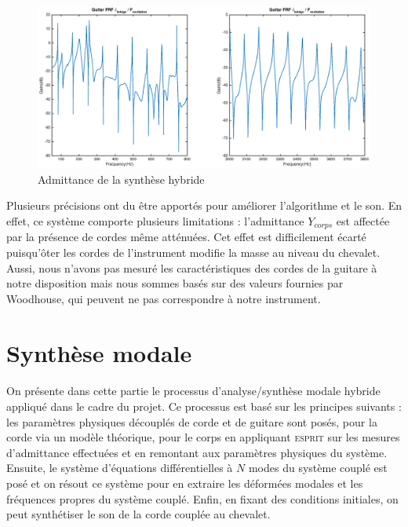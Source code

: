 \begin{figure}[h]
\centering
\includegraphics[width=\linewidth]{figures/FRF_E2.eps}
\caption{Admittance de la synthèse hybride}
\label{fig:frf_fig_1}
\end{figure}

Plusieurs précisions ont du être apportés pour améliorer l'algorithme et le
son. En effet, ce système comporte plusieurs limitations : l'admittance
$Y_{corps}$ est affectée par la présence de cordes même atténuées. Cet effet est difficilement écarté puisqu'ôter les cordes de l'instrument modifie la masse au niveau du chevalet. Aussi, nous n'avons pas mesuré les caractéristiques des cordes de la guitare à notre disposition mais nous sommes basés sur des valeurs fournies par Woodhouse, qui peuvent ne pas correspondre à notre instrument.\\


%
%
%
%


\section{Synthèse modale}

\paragraph{}
  On présente dans cette partie le processus d'analyse/synthèse modale hybride
appliqué dans le cadre du projet. Ce processus est basé sur les principes
suivants : les paramètres physiques découplés de corde et de guitare sont
posés, pour la corde via un modèle théorique, pour le corps en appliquant
\textsc{esprit} sur les mesures d'admittance effectuées et en remontant aux
paramètres physiques du système.
  Ensuite, le système d'équations différentielles à \( N \) modes du système
couplé est posé et on résout ce système pour en extraire les déformées modales
et les fréquences propres du système couplé. Enfin, en fixant des
conditions initiales, on peut synthétiser le son de la corde couplée au
chevalet.

